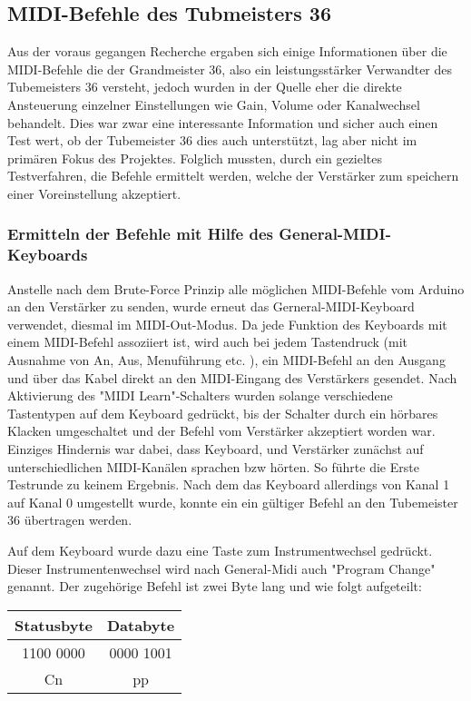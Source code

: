 \documentclass[10pt,a4paper]{report}
\begin{document}
\subsection{MIDI-Befehle des Tubmeisters 36}
\begin{flushleft}

Aus der voraus gegangen Recherche ergaben sich einige Informationen über die MIDI-Befehle die der Grandmeister 36, also ein leistungsstärker Verwandter des Tubemeisters 36  versteht, jedoch wurden in der Quelle eher die direkte Ansteuerung einzelner Einstellungen wie Gain, Volume oder Kanalwechsel behandelt. Dies war zwar eine interessante Information und sicher auch einen Test wert, ob der Tubemeister 36 dies auch unterstützt, lag aber nicht im primären Fokus des Projektes. Folglich mussten, durch ein gezieltes Testverfahren, die Befehle ermittelt werden, welche der Verstärker zum speichern einer Voreinstellung akzeptiert. 
\subsubsection{Ermitteln der Befehle mit Hilfe des General-MIDI-Keyboards}
Anstelle nach dem Brute-Force Prinzip alle möglichen MIDI-Befehle vom Arduino an den Verstärker zu senden, wurde erneut das Gerneral-MIDI-Keyboard verwendet, diesmal im MIDI-Out-Modus. Da jede Funktion des Keyboards mit einem MIDI-Befehl assoziiert ist, wird auch bei jedem Tastendruck (mit Ausnahme von An, Aus, Menuführung etc. ), ein MIDI-Befehl an den Ausgang und über das Kabel direkt an den MIDI-Eingang des Verstärkers gesendet. Nach Aktivierung des "MIDI Learn"-Schalters wurden solange verschiedene Tastentypen auf dem Keyboard gedrückt, bis der Schalter durch ein hörbares Klacken umgeschaltet und der Befehl vom Verstärker akzeptiert worden war. 
Einziges Hindernis war dabei, dass Keyboard, und Verstärker zunächst auf unterschiedlichen MIDI-Kanälen sprachen bzw hörten. So führte die Erste Testrunde zu keinem Ergebnis. Nach dem das Keyboard allerdings von Kanal 1 auf Kanal 0 umgestellt wurde, konnte ein ein gültiger Befehl an den Tubemeister 36 übertragen werden. 

Auf dem Keyboard wurde dazu eine Taste zum Instrumentwechsel gedrückt. Dieser Instrumentenwechsel wird nach General-Midi auch "Program Change" genannt. Der zugehörige Befehl ist zwei Byte lang und wie folgt aufgeteilt:

\end{flushleft}	
\begin{center}


\begin{tabular}{c|c}

Statusbyte & Databyte \\ 
\hline 
1100 0000 & 0000 1001 \\ 
\hline 
Cn & pp \\ 

\end{tabular} 




\end{center} 
\end{document}
